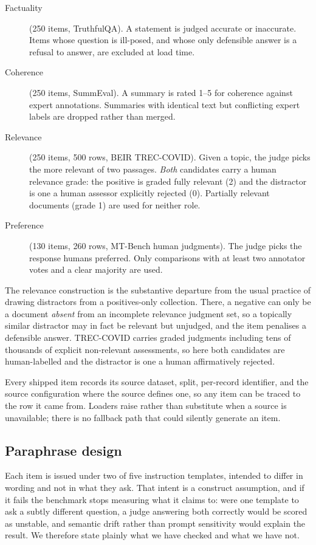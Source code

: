 \documentclass[11pt]{article}          %
\begin{document}
\begin{description}
  \item[Factuality] (250 items, TruthfulQA). A statement is judged accurate or
    inaccurate. Items whose question is ill-posed, and whose only defensible
    answer is a refusal to answer, are excluded at load time.
  \item[Coherence] (250 items, SummEval). A summary is rated 1--5 for
    coherence against expert annotations. Summaries with identical text but
    conflicting expert labels are dropped rather than merged.
  \item[Relevance] (250 items, 500 rows, BEIR TREC-COVID). Given a topic, the
    judge picks the more relevant of two passages. \emph{Both} candidates carry
    a human relevance grade: the positive is graded fully relevant (2) and the
    distractor is one a human assessor explicitly rejected (0). Partially
    relevant documents (grade 1) are used for neither role.
  \item[Preference] (130 items, 260 rows, MT-Bench human judgments). The judge
    picks the response humans preferred. Only comparisons with at least two
    annotator votes and a clear majority are used.
\end{description}

The relevance construction is the substantive departure from the usual practice
of drawing distractors from a positives-only collection. There, a negative can
only be a document \emph{absent} from an incomplete relevance judgment set, so a
topically similar distractor may in fact be relevant but unjudged, and the item
penalises a defensible answer. TREC-COVID carries graded judgments including
tens of thousands of explicit non-relevant assessments, so here both candidates
are human-labelled and the distractor is one a human affirmatively rejected.

Every shipped item records its source dataset, split, per-record identifier, and
the source configuration where the source defines one, so any item can be traced
to the row it came from.
Loaders raise rather than substitute when a source is unavailable; there is no
fallback path that could silently generate an item.

\subsection{Paraphrase design}

Each item is issued under two of five instruction templates, intended to differ
in wording and not in what they ask. That intent is a construct assumption, and
if it fails the benchmark stops measuring what it claims to: were one template
to ask a subtly different question, a judge answering both correctly would be
scored as unstable, and semantic drift rather than prompt sensitivity would
explain the result. We therefore state plainly what we have checked and what we
have not.
\end{document}
